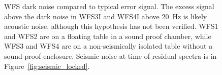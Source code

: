 \begin{figure}
\begin{centering}
\caption[WFS error signal and dark noise]{WFS dark noise compared to typical error signal. The excess signal above the dark noise in WFS3I and WFS4I above 20~Hz is likely acoustic noise, although this hypothesis has not been verified. WFS1 and WFS2 are on a floating table in a sound proof chamber, while WFS3 and WFS4 are on a non-seismically isolated table without a sound proof enclosure. Seismic noise at time of residual spectra is in Figure~\ref{fig:seismic_locked}.}
\label{fig:WFSdarknoise}
\end{centering}
\end{figure}



